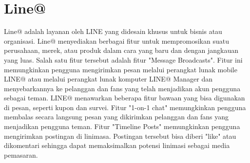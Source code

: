 \section{Line@}
\label{sec:Line@}
Line@ adalah layanan oleh LINE yang didesain khusus untuk bisnis atau organisasi. Line@ menyediakan berbagai fitur untuk mempromosikan suatu perusahaan, merek, atau produk dalam cara yang baru dan dengan jangkauan yang luas. Salah satu fitur tersebut adalah fitur "Message Broadcasts". Fitur ini memungkinkan pengguna mengirimkan pesan melalui perangkat lunak mobile LINE@ atau melalui perangkat lunak komputer LINE@ Manager dan menyebarkannya ke pelanggan dan fans yang telah menjadikan akun pengguna sebagai teman. LINE@ menawarkan beberapa fitur bawaan yang bisa digunakan di pesan, seperti kupon dan survei. Fitur "1-on-1 chat" memungkinkan pengguna membalas secara langsung pesan yang dikirimkan pelanggan dan fans yang menjadikan pengguna teman. Fitur "Timeline Posts" memungkinkan pengguna mengirimkan postingan di linimasa. Postingan tersebut bisa diberi "like" atau dikomentari sehingga dapat memaksimalkan potensi linimasi sebagai media pemasaran.\footnotemark
{}